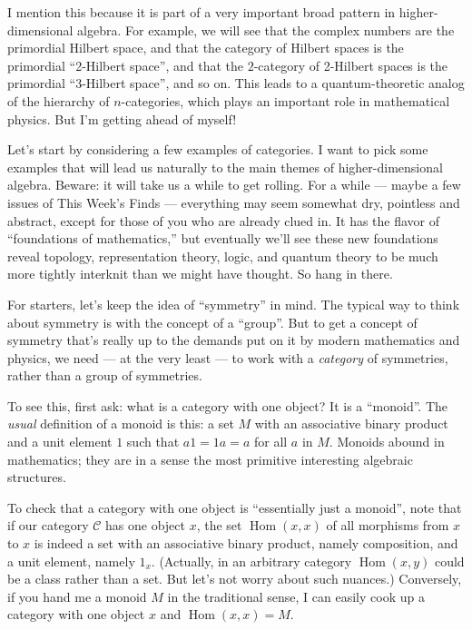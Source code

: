 \documentclass{article}
\begin{document}
I mention this because it is part of a very important broad pattern in
higher-dimensional algebra. For example, we will see that the complex
numbers are the primordial Hilbert space, and that the category of
Hilbert spaces is the primordial ``2-Hilbert space'', and that the
\(2\)-category of 2-Hilbert spaces is the primordial ``3-Hilbert
space'', and so on. This leads to a quantum-theoretic analog of the
hierarchy of \(n\)-categories, which plays an important role in
mathematical physics. But I'm getting ahead of myself!

Let's start by considering a few examples of categories. I want to pick
some examples that will lead us naturally to the main themes of
higher-dimensional algebra. Beware: it will take us a while to get
rolling. For a while --- maybe a few issues of This Week's Finds ---
everything may seem somewhat dry, pointless and abstract, except for
those of you who are already clued in. It has the flavor of
``foundations of mathematics,'' but eventually we'll see these new
foundations reveal topology, representation theory, logic, and quantum
theory to be much more tightly interknit than we might have thought. So
hang in there.

For starters, let's keep the idea of ``symmetry'' in mind. The typical
way to think about symmetry is with the concept of a ``group''. But to
get a concept of symmetry that's really up to the demands put on it by
modern mathematics and physics, we need --- at the very least --- to
work with a \emph{category} of symmetries, rather than a group of
symmetries.

To see this, first ask: what is a category with one object? It is a
``monoid''. The \emph{usual} definition of a monoid is this: a set \(M\)
with an associative binary product and a unit element \(1\) such that
\(a1 = 1a = a\) for all \(a\) in \(M\). Monoids abound in mathematics;
they are in a sense the most primitive interesting algebraic structures.

To check that a category with one object is ``essentially just a
monoid'', note that if our category \(\mathcal{C}\) has one object
\(x\), the set \(\operatorname{Hom}(x,x)\) of all morphisms from \(x\)
to \(x\) is indeed a set with an associative binary product, namely
composition, and a unit element, namely \(1_x\). (Actually, in an
arbitrary category \(\operatorname{Hom}(x,y)\) could be a class rather
than a set. But let's not worry about such nuances.) Conversely, if you
hand me a monoid \(M\) in the traditional sense, I can easily cook up a
category with one object \(x\) and \(\operatorname{Hom}(x,x) = M\).
\end{document}

